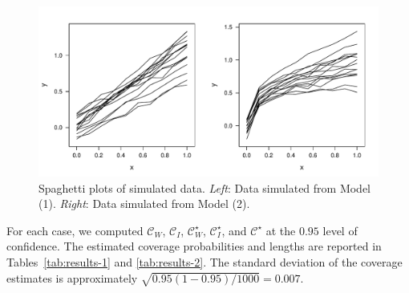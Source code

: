 \documentclass[useAMS,usenatbib,usegraphicx,referee]{biom}\usepackage[]{graphicx}\usepackage[]{color}
\newenvironment{knitrout}{}{} %
\newcommand{\boot}{\star}
\begin{document}
\begin{knitrout}
\color{fgcolor}\begin{figure}[]


{\centering \includegraphics[width=0.8\linewidth]{figure/simulation} 

}

\caption[Spaghetti plots of simulated data]{Spaghetti plots of simulated data. \textit{Left}: Data simulated from Model (1). \textit{Right}: Data simulated from Model (2).\label{fig:simulation}}
\end{figure}


\end{knitrout}


For each case, we computed $\mathcal{C}_W$, $\mathcal{C}_I$, $\mathcal{C}^\boot_W$, $\mathcal{C}^\boot_I$, and $\mathcal{C}^\boot$ at the $0.95$ level of confidence. The estimated coverage probabilities and lengths are reported in Tables~\ref{tab:results-1} and \ref{tab:results-2}. %
The standard deviation of the coverage estimates is approximately $\sqrt{0.95\left(1-0.95\right)/1000} = 0.007$. 
\end{document}
